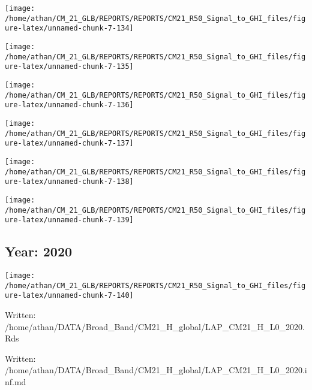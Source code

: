 \documentclass[
  11pt,
  a4paper,oneside]{article}
\begin{document}
\begin{center}\texttt{[image: /home/athan/CM\_21\_GLB/REPORTS/REPORTS/CM21\_R50\_Signal\_to\_GHI\_files/figure-latex/unnamed-chunk-7-134]} \end{center}

\begin{center}\texttt{[image: /home/athan/CM\_21\_GLB/REPORTS/REPORTS/CM21\_R50\_Signal\_to\_GHI\_files/figure-latex/unnamed-chunk-7-135]} \end{center}

\begin{center}\texttt{[image: /home/athan/CM\_21\_GLB/REPORTS/REPORTS/CM21\_R50\_Signal\_to\_GHI\_files/figure-latex/unnamed-chunk-7-136]} \end{center}

\begin{center}\texttt{[image: /home/athan/CM\_21\_GLB/REPORTS/REPORTS/CM21\_R50\_Signal\_to\_GHI\_files/figure-latex/unnamed-chunk-7-137]} \end{center}

\begin{center}\texttt{[image: /home/athan/CM\_21\_GLB/REPORTS/REPORTS/CM21\_R50\_Signal\_to\_GHI\_files/figure-latex/unnamed-chunk-7-138]} \end{center}

\begin{center}\texttt{[image: /home/athan/CM\_21\_GLB/REPORTS/REPORTS/CM21\_R50\_Signal\_to\_GHI\_files/figure-latex/unnamed-chunk-7-139]} \end{center}

\FloatBarrier

\newpage

\hypertarget{year-2020}{%
\subsection{Year: 2020}\label{year-2020}}

\begin{center}\texttt{[image: /home/athan/CM\_21\_GLB/REPORTS/REPORTS/CM21\_R50\_Signal\_to\_GHI\_files/figure-latex/unnamed-chunk-7-140]} \end{center}

Written: /home/athan/DATA/Broad\_Band/CM21\_H\_global/LAP\_CM21\_H\_L0\_2020.Rds

Written: /home/athan/DATA/Broad\_Band/CM21\_H\_global/LAP\_CM21\_H\_L0\_2020.inf.md
\end{document}
